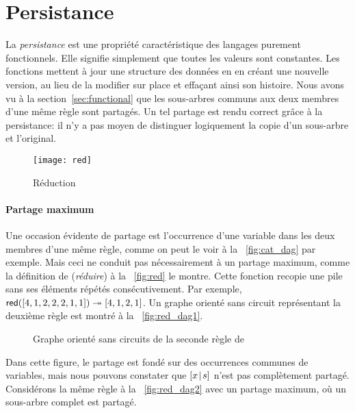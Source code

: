 \section{Persistance}
\label{sec:persistence}

La \emph{persistance} est une propriété
caractéristique des langages purement fonctionnels. Elle signifie
simplement que toutes les valeurs sont constantes. Les fonctions
mettent à jour une structure des données en en créant une nouvelle
version, au lieu de la modifier sur place et effaçant ainsi son
histoire. Nous avons vu à la section~\vref{sec:functional} que les
sous-arbres communs aux deux membres d'une même règle sont partagés.
Un tel partage est rendu correct grâce à la persistance: il n'y a pas
moyen de distinguer logiquement la copie d'un sous-arbre et
l'original.

%
\setlength{\intextsep}{0pt}
\begin{wrapfigure}[6]{r}[0pt]{0pt}
\centering
\texttt{[image: red]}
\caption{Réduction}
\label{fig:red}
\end{wrapfigure}

\paragraph{Partage maximum}

Une occasion évidente de partage est l'occurrence d'une variable dans
les deux membres d'une même règle, comme on peut le voir à la
\fig~\vref{fig:cat_dag} par exemple. Mais ceci ne conduit pas
nécessairement à un partage maximum, comme la définition de
 (\emph{réduire}) à la
\fig~\vref{fig:red} le montre. Cette fonction recopie une pile sans
ses éléments répétés consécutivement. Par exemple,
\(\textsf{red}([4,1,2,2,2,1,1]) \twoheadrightarrow [4,1,2,1]\). Un graphe
orienté sans circuit représentant la deuxième règle est montré à la
\fig~\vref{fig:red_dag1}.
\begin{figure}[b]
\centering
{}
\qquad\qquad
{}
\caption{Graphe orienté sans circuits de la seconde règle de }
\end{figure}
Dans cette figure, le partage est fondé sur des occurrences communes
de variables, mais nous pouvons constater que \([{x}\!\mid\!{s}]\) n'est
pas complètement partagé. Considérons la même règle à la
\fig~\vref{fig:red_dag2} avec un partage maximum, où un sous-arbre
complet est partagé.

